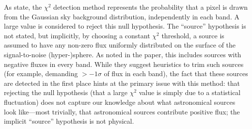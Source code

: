 \documentclass[11pt,letterpaper,linenumbers]{aastex63}
\begin{document}


As \cite{szalay1999} state, the $\chi^2$ detection method represents
the probability that a pixel is drawn from the Gaussian sky background
distribution, independently in each band.  A large value is
considered to reject this null hypothesis.  The ``source'' hypothesis
is not stated, but implicitly, by choosing a constant $\chi^2$
threshold, a source is assumed to have any non-zero flux uniformly
distributed on the surface of the signal-to-noise (hyper-)sphere.  As
noted in the paper, this includes sources with negative fluxes in
every band.  While they suggest heuristics to trim such sources (for
example, demanding $> -1 \sigma$ of flux in each band), the fact that
these sources are detected in the first place hints at the primary
issue with this method: that rejecting the null hypothesis (that a
large $\chi^2$ value is simply due to a statistical fluctuation) does
not capture our knowledge about what astronomical sources look
like---most trivially, that astronomical sources contribute positive
flux; the implicit ``source'' hypothesis is not physical.
\end{document}
